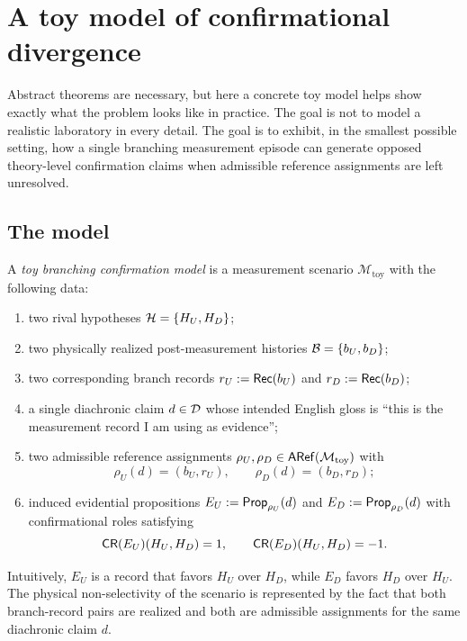 \section{A toy model of confirmational divergence}
\label{sec:toy}

Abstract theorems are necessary, but here a concrete toy model helps show exactly what the problem looks like in practice. The goal is not to model a realistic laboratory in every detail. The goal is to exhibit, in the smallest possible setting, how a single branching measurement episode can generate opposed theory-level confirmation claims when admissible reference assignments are left unresolved.

\subsection{The model}

\begin{definition}
\label{def:toy-model}
A \emph{toy branching confirmation model} is a measurement scenario $\mathcal{M}_{\mathrm{toy}}$ with the following data:
\begin{enumerate}
    \item two rival hypotheses $\mathcal{H}=\{H_U,H_D\}$;
    \item two physically realized post-measurement histories $\mathcal{B}=\{b_U,b_D\}$;
    \item two corresponding branch records $r_U:=\mathsf{Rec}(b_U)$ and $r_D:=\mathsf{Rec}(b_D)$;
    \item a single diachronic claim $d\in\mathcal{D}$ whose intended English gloss is \enquote{this is the measurement record I am using as evidence};
    \item two admissible reference assignments $\rho_U,\rho_D\in\mathsf{ARef}(\mathcal{M}_{\mathrm{toy}})$ with
    \[
    \rho_U(d)=(b_U,r_U),\qquad \rho_D(d)=(b_D,r_D);
    \]
    \item induced evidential propositions $E_U:=\mathsf{Prop}_{\rho_U}(d)$ and $E_D:=\mathsf{Prop}_{\rho_D}(d)$ with confirmational roles satisfying
    \[
    \mathsf{CR}(E_U)(H_U,H_D)=1,
    \qquad
    \mathsf{CR}(E_D)(H_U,H_D)=-1.
    \]
\end{enumerate}
\end{definition}

Intuitively, $E_U$ is a record that favors $H_U$ over $H_D$, while $E_D$ favors $H_D$ over $H_U$. The physical non-selectivity of the scenario is represented by the fact that both branch-record pairs are realized and both are admissible assignments for the same diachronic claim $d$.

